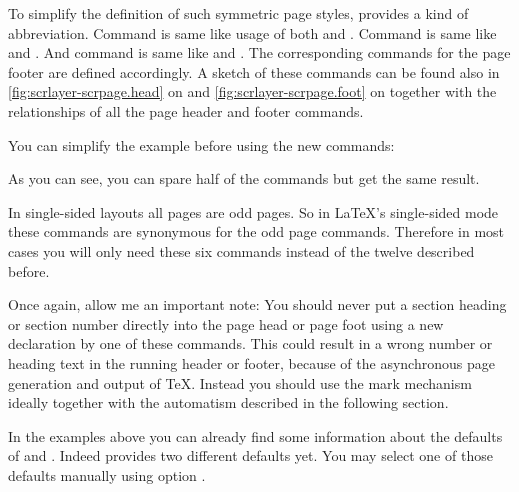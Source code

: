 To simplify the definition of such symmetric page styles,
 provides a kind of abbreviation. Command
 is same like usage of both  and
. Command  is same like  and
. And command  is same like  and
. The corresponding commands for the page footer are defined
accordingly. A sketch of these commands can be found also in
\autoref{fig:scrlayer-scrpage.head} on 
and \autoref{fig:scrlayer-scrpage.foot} on
 together with the relationships of all
the page header and footer commands.
%
\begin{Example}
  You can simplify the example before using the new commands:
  As you can see, you can spare half of the commands but get the same result.
\end{Example}
%
In single-sided layouts all pages are odd pages. So in LaTeX's single-sided
mode these commands are synonymous for the odd page commands. Therefore in
most cases you will only need these six commands instead of the twelve
described before.

Once again, allow me an important note: You should never
put a section heading or section number directly into the page head or
page foot using a new declaration by one of these commands. This could result in
a wrong number or heading text in the running header or footer, because of the
asynchronous page generation and output of \TeX. Instead you should use the
mark mechanism ideally together with the automatism described in the following
section.%
%
%
%
%
%
%


\begin{Declaration}
\end{Declaration}
%
%
In the examples above you can already find some information about the defaults
of  and
. Indeed
 provides two different defaults yet. You may select
one of those defaults manually using option .


